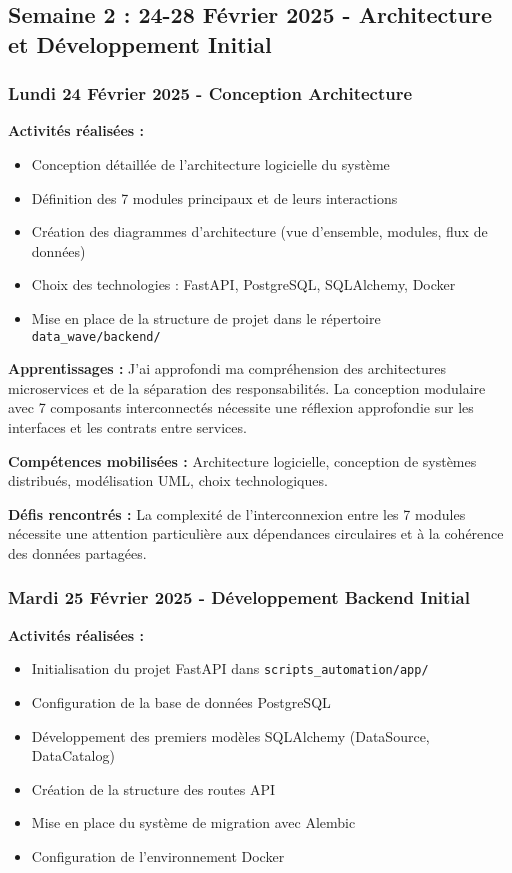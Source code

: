 \subsection{Semaine 2 : 24-28 Février 2025 - Architecture et Développement Initial}

\subsubsection{Lundi 24 Février 2025 - Conception Architecture}

\textbf{Activités réalisées :}
\begin{itemize}
    \item Conception détaillée de l'architecture logicielle du système
    \item Définition des 7 modules principaux et de leurs interactions
    \item Création des diagrammes d'architecture (vue d'ensemble, modules, flux de données)
    \item Choix des technologies : FastAPI, PostgreSQL, SQLAlchemy, Docker
    \item Mise en place de la structure de projet dans le répertoire \texttt{data\_wave/backend/}
\end{itemize}

\textbf{Apprentissages :}
J'ai approfondi ma compréhension des architectures microservices et de la séparation des responsabilités. La conception modulaire avec 7 composants interconnectés nécessite une réflexion approfondie sur les interfaces et les contrats entre services.

\textbf{Compétences mobilisées :}
Architecture logicielle, conception de systèmes distribués, modélisation UML, choix technologiques.

\textbf{Défis rencontrés :}
La complexité de l'interconnexion entre les 7 modules nécessite une attention particulière aux dépendances circulaires et à la cohérence des données partagées.

\subsubsection{Mardi 25 Février 2025 - Développement Backend Initial}

\textbf{Activités réalisées :}
\begin{itemize}
    \item Initialisation du projet FastAPI dans \texttt{scripts\_automation/app/}
    \item Configuration de la base de données PostgreSQL
    \item Développement des premiers modèles SQLAlchemy (DataSource, DataCatalog)
    \item Création de la structure des routes API
    \item Mise en place du système de migration avec Alembic
    \item Configuration de l'environnement Docker
\end{itemize}

